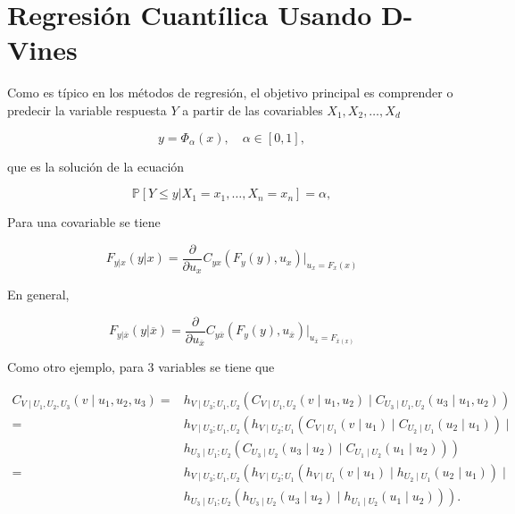 \section{Regresión Cuantílica Usando D-Vines}

Como es típico en los métodos de regresión, el objetivo principal es comprender o predecir la variable respuesta $Y$ a partir de las covariables $X_1, X_2, \dots , X_d$

\begin{equation}\label{regresion}
    y = \Phi_{\alpha}(x), \quad \alpha \in [0, 1],
\end{equation}

que es la solución de la ecuación 

\begin{equation}
     \mathbb{P}[Y \leq y | X_1 = x_1, \dots, X_n = x_n ] = \alpha,
\end{equation}

Para una covariable se tiene

\begin{equation}
    F_{y|x}(y|x) = \frac{\partial }{\partial u_x} C_{yx}(F_y(y), u_x) \Big|_{u_x = F_x(x)}  
\end{equation}

En general, 

\begin{equation}
    F_{y|\overline{x}}(y|\overline{x}) = \frac{\partial }{\partial u_{\overline{x}}} C_{y\overline{x}}(F_y(y), u_{\overline{x}}) \Big|_{u_{\overline{x}} =F_{\overline{x}(x)}} 
\end{equation}

Como otro ejemplo, para $3$ variables se tiene que 

\begin{equation}\label{quantileReg}
    \begin{aligned}
    C_{V \mid U_1, U_2, U_3}\left(v \mid u_1, u_2, u_3\right) 
    = & h_{V \mid U_3 ; U_1, U_2}\left(C_{V \mid U_1, U_2}\left(v \mid u_1, u_2\right) \mid C_{U_3 \mid U_1, U_2}\left(u_3 \mid u_1, u_2\right)\right) \\
    = & h_{V \mid U_3 ; U_1, U_2}\left(h_{V \mid U_2 ; U_1}\left(C_{V \mid U_1}\left(v \mid u_1\right) \mid C_{U_2 \mid U_1}\left(u_2 \mid u_1\right)\right) \mid\right. \\
    & \left.h_{U_3 \mid U_1 ; U_2}\left(C_{U_3 \mid U_2}\left(u_3 \mid u_2\right) \mid C_{U_1 \mid U_2}\left(u_1 \mid u_2\right)\right)\right) \\ 
    = & h_{V \mid U_3 ; U_1, U_2}\left(h_{V \mid U_2 ; U_1}\left(h_{V \mid U_1}\left(v \mid u_1\right) \mid h_{U_2 \mid U_1}\left(u_2 \mid u_1\right)\right) \mid\right. \\
    & \left.h_{U_3 \mid U_1 ; U_2}\left(h_{U_3 \mid U_2}\left(u_3 \mid u_2\right) \mid h_{U_1 \mid U_2}\left(u_1 \mid u_2\right)\right)\right).
    \end{aligned}
\end{equation}

